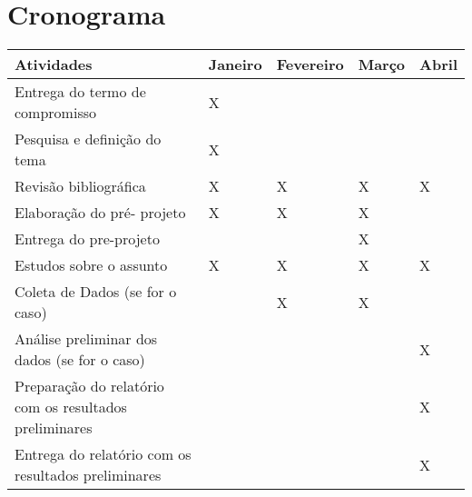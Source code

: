 \section{Cronograma}

\begin{table}[!h]
\begin{tabular}{|l|l|l|l|l|}
\hline
\textbf{Atividades}                                    & \textbf{Janeiro} & \textbf{Fevereiro} & \textbf{Março} & \textbf{Abril} \\ \hline
Entrega do termo de compromisso                        & X                &                    &                &                \\ \hline
Pesquisa e definição do tema                           & X                &                    &                &                \\ \hline
Revisão bibliográfica                                  & X                & X                  & X              & X              \\ \hline
Elaboração do pré- projeto                             & X                & X                  & X              &                \\ \hline
Entrega do pre-projeto                                 &                  &                    & X              &                \\ \hline
Estudos sobre o assunto                                & X                & X                  & X              & X              \\ \hline
Coleta de Dados (se for o caso)                        &                  & X                  & X              &                \\ \hline
Análise preliminar dos dados (se for o caso)           &                  &                    &                & X              \\ \hline
Preparação do relatório com os resultados preliminares &                  &                    &                & X              \\ \hline
Entrega do relatório com os resultados preliminares    &                  &                    &                & X              \\ \hline
\end{tabular}
\end{table}